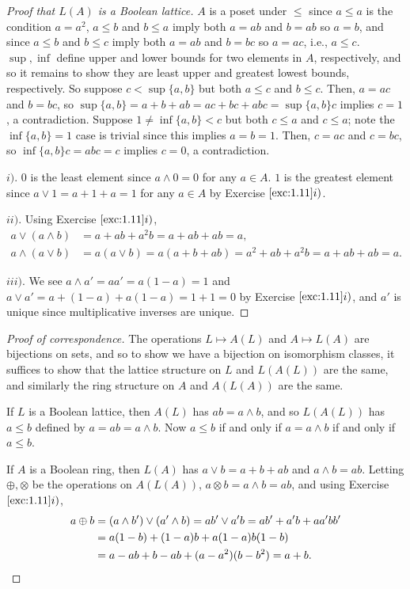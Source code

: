 \documentclass[12pt,letterpaper]{article}
\theoremstyle{definition}
\theoremstyle{remark}
\numberwithin{figure}{problem}
\numberwithin{equation}{section}
\begin{document}
\begin{proof}[Proof that $L(A)$ is a Boolean lattice]
  $A$ is a poset under $\le$ since $a \le a$ is the condition $a = a^2$, $a \le b$ and $b \le a$ imply both $a = ab$ and $b = ab$ so $a = b$, and since $a \le b$ and $b \le c$ imply both $a = ab$ and $b = bc$ so $a = ac$, i.e., $a \le c$. $\sup,\inf$ define upper and lower bounds for two elements in $A$, respectively, and so it remains to show they are least upper and greatest lowest bounds, respectively. So suppose $c < \sup\{a,b\}$ but both $a \le c$ and $b \le c$. Then, $a = ac$ and $b = bc$, so $\sup\{a,b\} = a + b + ab = ac + bc + abc = \sup\{a,b\}c$ implies $c = 1$, a contradiction. Suppose $1 \ne \inf\{a,b\} < c$ but both $c \le a$ and $c \le a$; note the $\inf\{a,b\} = 1$ case is trivial since this implies $a=b=1$. Then, $c = ac$ and $c = bc$, so $\inf\{a,b\}c = abc = c$ implies $c = 0$, a contradiction.
  \par $i)$. $0$ is the least element since $a \land 0 = 0$ for any $a \in A$. $1$ is the greatest element since $a \lor 1 = a + 1 + a = 1$ for any $a \in A$ by Exercise $\ref{exc:1.11}i)$.
  \par $ii)$. Using Exercise $\ref{exc:1.11}i)$,
  \begin{align*}
    a \lor (a \land b) &= a + ab + a^2b = a + ab + ab = a,\\
    a \land (a \lor b) &= a(a \lor b) = a(a + b + ab) = a^2 + ab + a^2b = a + ab + ab = a.
  \end{align*}
  \par $iii)$. We see $a \land a' = aa' = a(1-a) = 1$ and $a \lor a' = a + (1-a) + a(1-a) = 1 + 1 = 0$ by Exercise $\ref{exc:1.11}i)$, and $a'$ is unique since multiplicative inverses are unique.
\end{proof}
\begin{proof}[Proof of correspondence]
  The operations $L \mapsto A(L)$ and $A \mapsto L(A)$ are bijections on sets, and so to show we have a bijection on isomorphism classes, it suffices to show that the lattice structure on $L$ and $L(A(L))$ are the same, and similarly the ring structure on $A$ and $A(L(A))$ are the same.
  \par If $L$ is a Boolean lattice, then $A(L)$ has $ab = a \land b$, and so $L(A(L))$ has $a \leqslant b$ defined by $a = ab = a \land b$. Now $a \leqslant b$ if and only if $a = a \land b$ if and only if $a \le b$.
  \par If $A$ is a Boolean ring, then $L(A)$ has $a \lor b = a + b + ab$ and $a \land b = ab$. Letting $\oplus,\otimes$ be the operations on $A(L(A))$, $a \otimes b = a \land b = ab$, and using Exercise $\ref{exc:1.11}i)$,
  \begin{align*}
    a \oplus b &= (a \land b') \lor (a' \land b) = ab' \lor a'b = ab' + a'b + aa'bb'\\
    &= a(1-b) + (1-a)b + a(1-a)b(1-b)\\
    &= a - ab + b - ab + (a-a^2)(b-b^2) = a + b.\qedhere
  \end{align*}
\end{proof}
\end{document}
